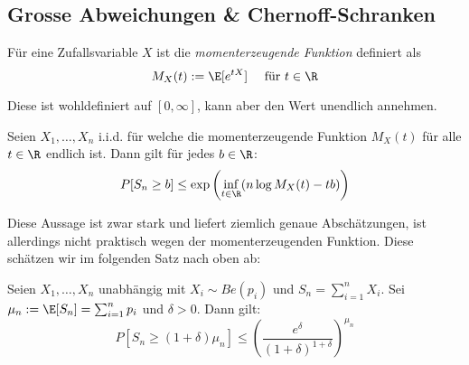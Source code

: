 \subsection{Grosse Abweichungen \& Chernoff-Schranken}
\begin{definition}
Für eine Zufallsvariable $X$ ist die \textit{momenterzeugende Funktion} definiert als
$$ M_X(t) := \E[e^{tX}] \quad \mbox{ für } t\in \R$$
\end{definition}
Diese ist wohldefiniert auf $[0,\infty]$, kann aber den Wert unendlich annehmen.
\begin{satz}
Seien $X_1,\dots,X_n$ i.i.d. für welche die momenterzeugende Funktion $M_X(t)$ für alle $t\in\R$ endlich ist. Dann gilt für jedes $b\in\R$:
$$ P[S_n \geq b] \leq \exp\left( \inf_{t\in\R} (n\log M_X(t) - tb) \right)$$
\end{satz}
Diese Aussage ist zwar stark und liefert ziemlich genaue Abschätzungen, ist allerdings nicht praktisch wegen der momenterzeugenden Funktion. Diese schätzen wir im folgenden Satz nach oben ab:

\begin{satz}
Seien $X_1,\dots,X_n$ unabhängig mit $X_i \sim Be(p_i)$ und $S_n = \sum_{i=1}^n X_i$. Sei $\mu_n := \E[S_n] = \sum_{i=1}^n p_i$ und $\delta > 0$. Dann gilt:
$$
	P[S_n \geq (1+\delta) \mu_n] \leq
	\left(
		\frac{e^\delta}{(1+\delta)^{1+\delta}}
	\right)
	^{\mu_n}
$$
\end{satz}
